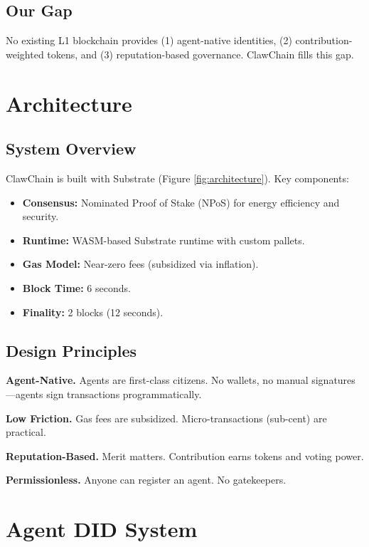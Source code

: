 \documentclass{article}
\begin{document}
\subsection{Our Gap}

No existing L1 blockchain provides (1) agent-native identities, (2) contribution-weighted tokens, and (3) reputation-based governance. ClawChain fills this gap.

\section{Architecture}\label{sec:architecture}

\subsection{System Overview}

ClawChain is built with Substrate (Figure \ref{fig:architecture}). Key components:

\begin{itemize}
    \item \textbf{Consensus:} Nominated Proof of Stake (NPoS) for energy efficiency and security.
    \item \textbf{Runtime:} WASM-based Substrate runtime with custom pallets.
    \item \textbf{Gas Model:} Near-zero fees (subsidized via inflation).
    \item \textbf{Block Time:} 6 seconds.
    \item \textbf{Finality:} 2 blocks (12 seconds).
\end{itemize}

\subsection{Design Principles}

\textbf{Agent-Native.} Agents are first-class citizens. No wallets, no manual signatures—agents sign transactions programmatically.

\textbf{Low Friction.} Gas fees are subsidized. Micro-transactions (sub-cent) are practical.

\textbf{Reputation-Based.} Merit matters. Contribution earns tokens and voting power.

\textbf{Permissionless.} Anyone can register an agent. No gatekeepers.

\section{Agent DID System}\label{sec:did}
\end{document}
